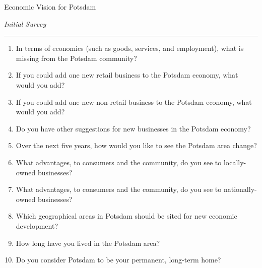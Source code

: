 \documentclass[12pt]{article}
\begin{document}
\begin{center}
{\Huge Economic Vision for Potsdam}

\vspace{0.1in}

{\Large {\em Initial Survey}}

\rule{0.9\textwidth}{0.1ex}
\end{center}

\begin{enumerate}
\item In terms of economics (such as goods, services, and employment), what is missing from the Potsdam community?

\vspace{1.25in}


\item If you could add one new retail business to the Potsdam economy, what would you add?

\vspace{1.25in}


\item If you could add one new non-retail business to the Potsdam economy, what would you add?

\vspace{1.25in}

\item Do you have other suggestions for new businesses in the Potsdam economy?

\vspace{1.25in}


\item Over the next five years, how would you like to see the Potsdam area change?

\vspace{1.25in}


\item What advantages, to consumers and the community, do you see to locally-owned businesses?

\vspace{1.25in}

\item What advantages, to consumers and the community, do you see to nationally-owned businesses?

\vspace{1.25in}

\item Which geographical areas in Potsdam should be sited for new economic development?

\vspace{1.25in}

\item How long have you lived in the Potsdam area?

\vspace{1.25in}

\item Do you consider Potsdam to be your permanent, long-term home?


\end{enumerate}
\end{document}
